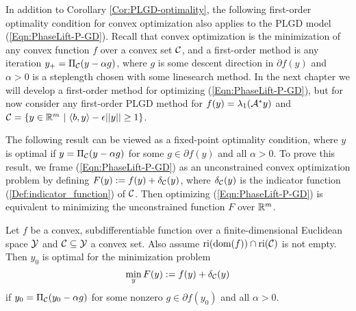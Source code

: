 In addition to Corollary \ref{Cor:PLGD-optimality}, the following first-order optimality condition for convex optimization also applies to the PLGD model (\ref{Eqn:PhaseLift-P-GD}).  Recall that convex optimization is the minimization of any convex function $f$ over a convex set ${\mathcal C}$, and a first-order method is any iteration $y_+ = \Pi_{\mathcal C}(y - \alpha g)$, where $g$ is some descent direction in $\partial f(y)$ and $\alpha > 0$ is a steplength chosen with some linesearch method.  In the next chapter we will develop a first-order method for optimizing (\ref{Eqn:PhaseLift-P-GD}), but for now consider any first-order PLGD method for $f(y) = \lambda_1({\mathcal A}^*y)$ and ${\mathcal C} = \{ y \in \mathbb{R}^m \ | \ \langle b, y \rangle - \epsilon ||y|| \geq 1 \}$.


The following result can be viewed as a fixed-point optimality condition, where $y$ is optimal if $y = \Pi_{\mathcal C}(y - \alpha g)$ for some $g \in \partial f(y)$ and all $\alpha > 0$.  To prove this result, we frame (\ref{Eqn:PhaseLift-P-GD}) as an unconstrained convex optimization problem by defining $F(y) := f(y) + \delta_{\mathcal C}(y)$, where $\delta_{\mathcal C}(y)$ is the indicator function (\ref{Def:indicator_function}) of ${\mathcal C}$.  Then optimizing (\ref{Eqn:PhaseLift-P-GD}) is equivalent to minimizing the unconstrained function $F$ over ${\mathbb R}^m$.  

\begin{prop} 			\label{Prop:PLGD-opt_unconstrained}
Let $f$ be a convex, subdifferentiable function over a finite-dimensional Euclidean space ${\mathcal Y}$ and ${\mathcal C} \subseteq {\mathcal Y}$ a convex set.  Also assume $\textnormal{ri}( \textnormal{dom} (f)) \cap \textnormal{ri}({\mathcal C})$ is not empty.   Then $y_0$ is optimal for the minimization problem
\begin{equation} 			\label{Eqn:subdiff_optimality_prop}
\min_{\substack{y}} F(y) := f(y) + \delta_{\mathcal C}(y)
\end{equation}
if $y_0 = \Pi_{\mathcal C}(y_0 - \alpha g)$ for some nonzero $g \in \partial f(y_0)$ and all $\alpha >0$.
\end{prop}

